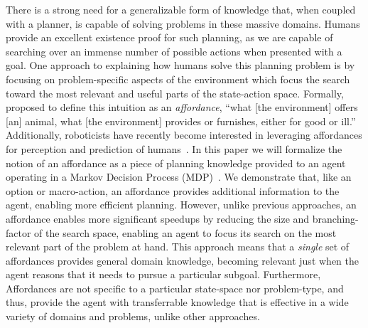 \documentclass[]{article}
\begin{document}
There is a strong need for a generalizable form of knowledge that,
when coupled with a planner, is capable of solving problems in these
massive domains. Humans provide an excellent existence proof for such
planning, as we are capable of searching over an immense number of
possible actions when presented with a goal.  One approach to
explaining how humans solve this planning problem is by focusing on
problem-specific aspects of the environment which focus the search
toward the most relevant and useful parts of the state-action space.
Formally, \citet{gibson77} proposed to define this intuition as an
{\em affordance}, ``what [the environment] offers [an] animal, what
[the environment] provides or furnishes, either for good or ill.''
Additionally, roboticists have recently become interested in
leveraging affordances for perception and prediction of
humans~\citep{koppula13a, koppula13b}. In this paper we will formalize
the notion of an affordance as a piece of planning knowledge provided
to an agent operating in a Markov Decision Process
(MDP)~\citep{kaelbling99}.  We demonstrate that, like an option or
macro-action, an affordance provides additional information to the
agent, enabling more efficient planning.  However, unlike previous
approaches, an affordance enables more significant speedups by
reducing the size and branching-factor of the search space, enabling
an agent to focus its search on the most relevant part of the problem
at hand.  This approach means that a {\em single} set of affordances
provides general domain knowledge, becoming relevant just when the
agent reasons that it needs to pursue a particular subgoal.  Furthermore,
Affordances are not specific to a particular state-space nor problem-type, and thus, provide
the agent with transferrable knowledge that is effective in a wide variety of
domains and problems, unlike other approaches.
\end{document}
